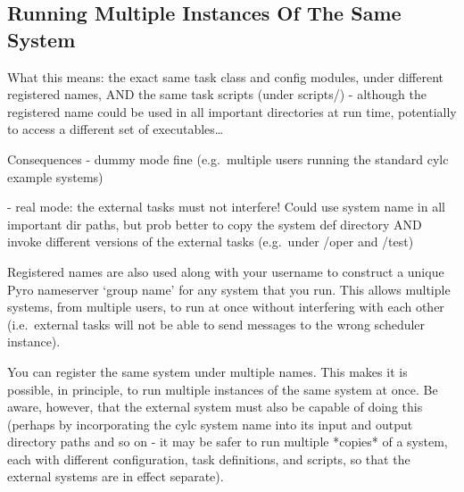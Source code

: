 \documentclass[11pt,a4paper]{article}
\begin{document}
%

\subsection{Running Multiple Instances Of The Same System}
\label{RunningMultipleInstancesOfTheSameSystem}

What this means: the exact same task class and config modules, under
different registered names, AND the same task scripts (under scripts/)
- although the registered name could be used in all important
directories at run time, potentially to access a different set of 
executables\dots

Consequences - dummy mode fine (e.g.\ multiple users running the standard
cylc example systems)

             - real mode: the external tasks must not interfere! Could
             use system name in all important dir paths, but prob better 
             to copy the system def directory AND invoke different versions
             of the external tasks (e.g.\ under /oper and /test)

    Registered names are also used along with your username to construct
    a unique Pyro nameserver `group name' for any system that you run.
    This allows multiple systems, from multiple users, to run at once
    without interfering with each other (i.e.\ external tasks will not
    be able to send messages to the wrong scheduler instance).
    
    You can register the same system under multiple names. This makes it
    is possible, in principle, to run multiple instances of the same
    system at once. Be aware, however, that the external system must
    also be capable of doing this (perhaps by incorporating the cylc
    system name into its input and output directory paths and so on - it
    may be safer to run multiple *copies* of a system, each with
    different configuration, task definitions, and scripts, so that the
    external systems are in effect separate).
\end{document}
